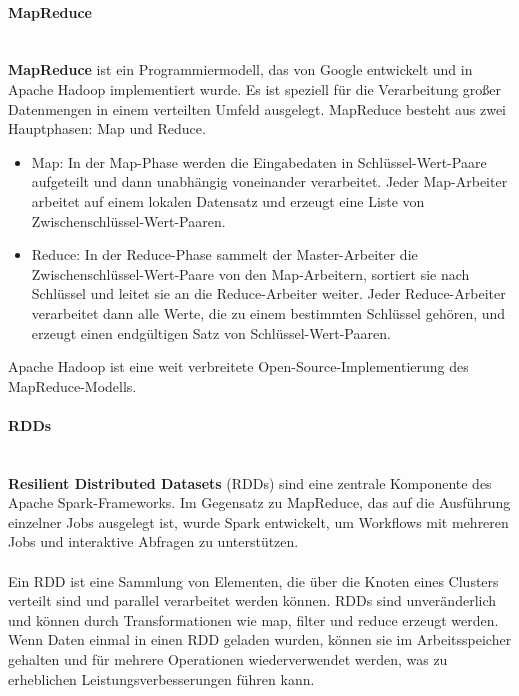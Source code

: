 \paragraph{MapReduce}\mbox{}\\
\textbf{MapReduce} ist ein Programmiermodell, das von Google entwickelt und in Apache Hadoop implementiert wurde. Es ist speziell für die Verarbeitung großer Datenmengen in einem verteilten Umfeld ausgelegt. MapReduce besteht aus zwei Hauptphasen: Map und Reduce.
\begin{itemize}
\item Map: In der Map-Phase werden die Eingabedaten in Schlüssel-Wert-Paare aufgeteilt und dann unabhängig voneinander verarbeitet. Jeder Map-Arbeiter arbeitet auf einem lokalen Datensatz und erzeugt eine Liste von Zwischenschlüssel-Wert-Paaren.
\item Reduce: In der Reduce-Phase sammelt der Master-Arbeiter die Zwischenschlüssel-Wert-Paare von den Map-Arbeitern, sortiert sie nach Schlüssel und leitet sie an die Reduce-Arbeiter weiter. Jeder Reduce-Arbeiter verarbeitet dann alle Werte, die zu einem bestimmten Schlüssel gehören, und erzeugt einen endgültigen Satz von Schlüssel-Wert-Paaren. 
\end{itemize}
Apache Hadoop ist eine weit verbreitete Open-Source-Implementierung des MapReduce-Modells. 
\paragraph{RDDs}\mbox{}\\
\textbf{Resilient Distributed Datasets} (RDDs) sind eine zentrale Komponente des Apache Spark-Frameworks. Im Gegensatz zu MapReduce, das auf die Ausführung einzelner Jobs ausgelegt ist, wurde Spark entwickelt, um Workflows mit mehreren Jobs und interaktive Abfragen zu unterstützen.
\\\\
Ein RDD ist eine Sammlung von Elementen, die über die Knoten eines Clusters verteilt sind und parallel verarbeitet werden können. RDDs sind unveränderlich und können durch Transformationen wie map, filter und reduce erzeugt werden. Wenn Daten einmal in einen RDD geladen wurden, können sie im Arbeitsspeicher gehalten und für mehrere Operationen wiederverwendet werden, was zu erheblichen Leistungsverbesserungen führen kann.


